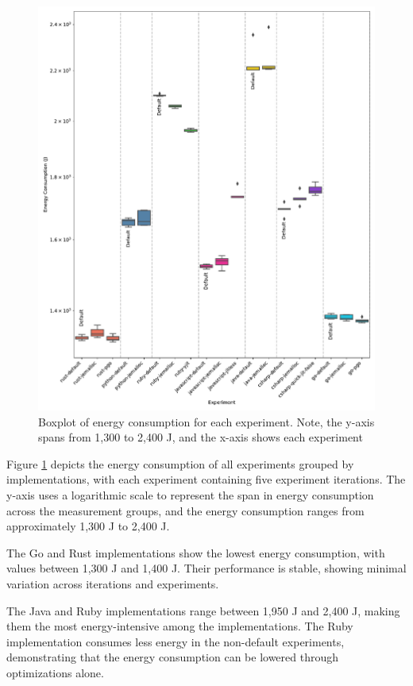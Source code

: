\documentclass[main.tex]{subfiles}
\begin{document}
\begin{figure}[]
    \centering
    \includegraphics[scale=0.7]{media/results/boxplot.pdf}
    \caption{Boxplot of energy consumption for each experiment. Note, the y-axis spans from 1,300 to 2,400 J, and the x-axis shows each experiment}
    \label{fig:boxplot}
\end{figure}

Figure \ref{fig:boxplot} depicts the energy consumption of all experiments grouped by implementations, with each experiment containing five experiment iterations. The y-axis uses a logarithmic scale to represent the span in energy consumption across the measurement groups, and the energy consumption ranges from approximately 1,300 J to 2,400 J.

The Go and Rust implementations show the lowest energy consumption, with values between 1,300 J and 1,400 J. Their performance is stable, showing minimal variation across iterations and experiments. 

The Java and Ruby implementations range between 1,950 J and 2,400 J, making them the most energy-intensive among the implementations. The Ruby implementation consumes less energy in the non-default experiments, demonstrating that the energy consumption can be lowered through optimizations alone. 
\end{document}
